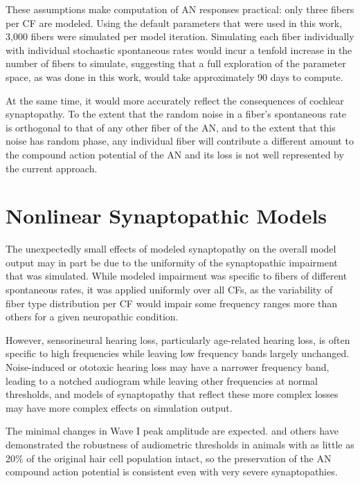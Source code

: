 These assumptions make computation of AN responses practical: only three fibers per CF are modeled.  Using the default parameters that were used in this work, 3,000 fibers were simulated per model iteration.  Simulating each fiber individually with individual stochastic spontaneous rates would incur a tenfold increase in the number of fibers to simulate, suggesting that a full exploration of the parameter space, as was done in this work, would take approximately 90 days to compute.

At the same time, it would more accurately reflect the consequences of cochlear synaptopathy.  To the extent that the random noise in a fiber's spontaneous rate is orthogonal to that of any other fiber of the AN, and to the extent that this noise has random phase, any individual fiber will contribute a different amount to the compound action potential of the AN and its loss is not well represented by the current approach.  

\section{Nonlinear Synaptopathic Models} %
\label{sec:nonlinear_synaptopathic_models}
The unexpectedly small effects of modeled synaptopathy on the overall model output may in part be due to the uniformity of the synaptopathic impairment that was simulated.  While modeled impairment was specific to fibers of different spontaneous rates, it was applied uniformly over all CFs, as the variability of fiber type distribution per CF would impair some frequency ranges more than others for a given neuropathic condition. 

However, sensorineural hearing loss, particularly age-related hearing loss, is often specific to high frequencies while leaving low frequency bands largely unchanged.   Noise-induced or ototoxic hearing loss may have a narrower frequency band, leading to a notched audiogram while leaving other frequencies at normal thresholds, and models of synaptopathy that reflect these more complex losses may have more complex effects on simulation output.

The minimal changes in Wave I peak amplitude are expected.
\citeauthor{Liberman2014Efferent} and others have demonstrated the robustness of audiometric thresholds in animals with as little as 20\% of the original hair cell population intact, so the preservation of the AN compound action potential is consistent even with very severe synaptopathies.
